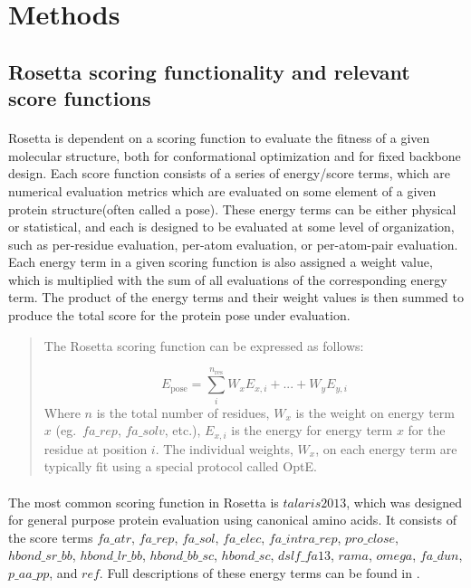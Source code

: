 \section{Methods}

\subsection{Rosetta scoring functionality and relevant score functions}
\paragraph{}
Rosetta is dependent on a scoring function to evaluate the fitness of a given molecular structure, both for conformational optimization and for fixed backbone design.
Each score function consists of a series of energy/score terms, which are numerical evaluation metrics which are evaluated on some element of a given protein structure(often called a pose).
These energy terms can be either physical or statistical, and each is designed to be evaluated at some level of organization, such as per-residue evaluation, per-atom evaluation, or per-atom-pair evaluation.
Each energy term in a given scoring function is also assigned a weight value, which is multiplied with the sum of all evaluations of the corresponding energy term.
The product of the energy terms and their weight values is then summed to produce the total score for the protein pose under evaluation.

\begin{quote} 
The Rosetta scoring function can be expressed as follows:

\begin{equation}
E_{\text{pose}} = \sum_{i}^{n_{\text{res}}} W_{x} E_{x,i} + ... + W_{y} E_{y,i}
\end{equation}
Where $n$ is the total number of residues, $W_{x}$ is the weight on energy term $x$ (eg.\ $fa\_rep$, $fa\_solv$, etc.), $E_{x,i}$ is the energy for energy term $x$ for the residue at position $i$. 
The individual weights, $W_x$, on each energy term are typically fit using a special protocol called OptE\cite{leaver-fay_chapter_2013}.
\end{quote}

\paragraph{}
The most common scoring function in Rosetta is $talaris2013$, which was designed for general purpose protein evaluation using canonical amino acids\cite{leaver-fay_chapter_2013}.
It consists of the score terms $fa\_atr$, $fa\_rep$, $fa\_sol$, $fa\_elec$, $fa\_intra\_rep$, $pro\_close$, $hbond\_sr\_bb$, $hbond\_lr\_bb$, $hbond\_bb\_sc$, $hbond\_sc$, $dslf\_fa13$, $rama$, $omega$, $fa\_dun$, $p\_aa\_pp$, and $ref$.
Full descriptions of these energy terms can be found in \cite{leaver-fay_chapter_2013}.

